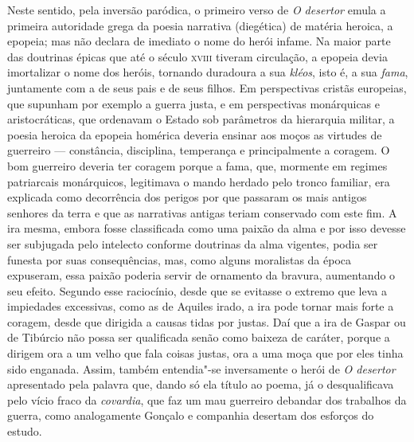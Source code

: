 Neste sentido, pela inversão paródica, o primeiro verso de \textit{O desertor}
emula a primeira autoridade grega da poesia narrativa (diegética) de
matéria heroica, a epopeia; mas não declara de imediato o nome do herói infame.
Na maior parte das doutrinas épicas que até o século \textsc{xviii} tiveram
circulação, a epopeia devia imortalizar o nome dos heróis, tornando duradoura a
sua \textit{kléos}, isto é, a sua \textit{fama}, juntamente com a de seus pais e
de seus filhos.  Em perspectivas cristãs europeias, que supunham por exemplo a
guerra justa, e em perspectivas monárquicas e aristocráticas, que ordenavam o
Estado sob parâmetros da hierarquia militar, a poesia heroica da epopeia
homérica deveria ensinar aos moços as virtudes de guerreiro --- constância,
disciplina, temperança e principalmente a coragem.  O bom guerreiro deveria ter
coragem porque a fama, que, mormente em regimes patriarcais monárquicos,
legitimava o mando herdado pelo tronco familiar, era explicada como decorrência
dos perigos por que passaram os mais antigos senhores da terra e que as
narrativas antigas teriam conservado com este fim. A ira mesma, embora fosse
classificada como uma paixão da alma e por isso devesse ser subjugada pelo
intelecto conforme doutrinas da alma vigentes, podia ser funesta por suas
consequências, mas, como alguns moralistas da época expuseram, essa paixão
poderia servir de ornamento da bravura, aumentando o seu efeito. Segundo esse
raciocínio,  desde que se evitasse o extremo que leva a impiedades excessivas,
como as de Aquiles irado, a ira pode tornar mais forte a coragem, desde que
dirigida a causas tidas por justas.  Daí que a ira de Gaspar ou de Tibúrcio não
possa ser qualificada senão como baixeza de caráter, porque a dirigem ora a um
velho que fala coisas justas, ora a uma moça que por eles tinha sido enganada.
Assim, também entendia"-se inversamente o herói de \textit{O desertor}
apresentado pela palavra que, dando só ela título ao poema, já o desqualificava
pelo vício fraco da \textit{covardia}, que faz um mau guerreiro debandar dos
trabalhos da guerra, como analogamente Gonçalo e companhia desertam dos esforços
do estudo.

